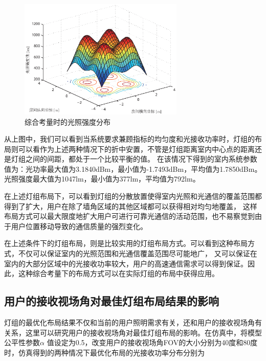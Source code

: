 \begin{figure}[htbp]
    \centering
	\includegraphics[width=0.7\textwidth]{figures/chapter-3/BestIllu.eps}
	\caption{综合考量时的光照强度分布}
	\label{fig:best_illu}
\end{figure}

从上图中，我们可以看到当系统要求兼顾指标的均匀度和光接收功率时，灯组的布局则可以看作为上述两种情况下的折中安置，不管是灯组距离室内中心点的距离还是灯组之间的间距，都处于一个比较平衡的值。
在该情况下得到的室内系统参数值为：光功率最大值为3.1840dBm，最小值为-1.7493dBm，平均值为1.7850dBm。光照强度最大值为1047lm，最小值为377lm，平均值为792lm。

在上述灯组布局下，可以看到灯组的分散放置使得室内光照和光通信的覆盖范围都得到了扩大，用户在除了墙角区域的其他区域都可以获得相对均匀地覆盖，
这样布局方式可以最大限度地扩大用户可进行可靠光通信的活动范围，也不易察觉到由于用户位置移动导致的通信质量的强烈变化。

在上述条件下的灯组布局，则是比较实用的灯组布局方式。可以看到这种布局方式，不仅可以保证室内的光照范围和光通信覆盖范围尽可能地广，
又可以保证在室内的大部分区域中的光接收功率较大，用户的高速通信需求可以得到保证。因此，这种综合考量下的布局方式可以在实际灯组的布局中获得应用。

\subsection{用户的接收视场角对最佳灯组布局结果的影响}
灯组的最优化布局结果不仅和当前的用户照明需求有关，还和用户的接收视场角有关系，这里可以研究用户的接收视场角对最佳灯组布局的影响。在仿真中，将模型公平性参数$\alpha$ 值设定为0.5，改变用户的接收视场角FOV的大小分别为40度和80度时，仿真得到的两种情况下最优化布局的光接收功率分布分别为

